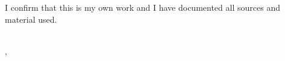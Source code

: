 \thispagestyle{empty}
\vspace*{0.8\textheight}
\noindent
I confirm that this \getDoctype{} is my own work and I have documented all sources and material used.

\vspace{15mm}
\noindent
\getAuthor{}
\\
\getSubmissionLocation{}, \getSubmissionDate{} 
\cleardoublepage{}
